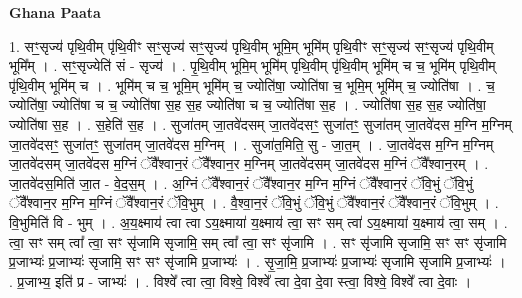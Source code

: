 \documentclass[17pt]{extarticle}
\begin{document}
\textbf{Ghana Paata } \newline

1. सꣳ॒॒सृज्य॑ पृथि॒वीम् पृ॑थि॒वीꣳ सꣳ॒॒सृज्य॑ सꣳ॒॒सृज्य॑ पृथि॒वीम् भूमि॒म् भूमि॑म् पृथि॒वीꣳ सꣳ॒॒सृज्य॑ सꣳ॒॒सृज्य॑ पृथि॒वीम् भूमि᳚म् । . सꣳ॒॒सृज्येति॑ सं - सृज्य॑ । . पृ॒थि॒वीम् भूमि॒म् भूमि॑म् पृथि॒वीम् पृ॑थि॒वीम् भूमि॑म् च च॒ भूमि॑म् पृथि॒वीम् पृ॑थि॒वीम् भूमि॑म् च । . भूमि॑म् च च॒ भूमि॒म् भूमि॑म् च॒ ज्योति॑षा॒ ज्योति॑षा च॒ भूमि॒म् भूमि॑म् च॒ ज्योति॑षा । . च॒ ज्योति॑षा॒ ज्योति॑षा च च॒ ज्योति॑षा स॒ह स॒ह ज्योति॑षा च च॒ ज्योति॑षा स॒ह । . ज्योति॑षा स॒ह स॒ह ज्योति॑षा॒ ज्योति॑षा स॒ह । . स॒हेति॑ स॒ह । . सुजा॑तम् जा॒तवे॑दसम् जा॒तवे॑दसꣳ॒॒ सुजा॑तꣳ॒॒ सुजा॑तम् जा॒तवे॑दस म॒ग्नि म॒ग्निम् जा॒तवे॑दसꣳ॒॒ सुजा॑तꣳ॒॒ सुजा॑तम् जा॒तवे॑दस म॒ग्निम् । . सुजा॑त॒मिति॒ सु - जा॒त॒म् । . जा॒तवे॑दस म॒ग्नि म॒ग्निम् जा॒तवे॑दसम् जा॒तवे॑दस म॒ग्निं ॅवै᳚श्वान॒रं ॅवै᳚श्वान॒र म॒ग्निम् जा॒तवे॑दसम् जा॒तवे॑दस म॒ग्निं ॅवै᳚श्वान॒रम् । . जा॒तवे॑दस॒मिति॑ जा॒त - वे॒द॒स॒म् । . अ॒ग्निं ॅवै᳚श्वान॒रं ॅवै᳚श्वान॒र म॒ग्नि म॒ग्निं ॅवै᳚श्वान॒रं ॅवि॒भुं ॅवि॒भुं ॅवै᳚श्वान॒र म॒ग्नि म॒ग्निं ॅवै᳚श्वान॒रं ॅवि॒भुम् । . वै॒श्वा॒न॒रं ॅवि॒भुं ॅवि॒भुं ॅवै᳚श्वान॒रं ॅवै᳚श्वान॒रं ॅवि॒भुम् । . वि॒भुमिति॑ वि - भुम् । . अ॒य॒क्ष्माय॑ त्वा त्वा ऽय॒क्ष्माया॑ य॒क्ष्माय॑ त्वा॒ सꣳ सम् त्वा॑ ऽय॒क्ष्माया॑ य॒क्ष्माय॑ त्वा॒ सम् । . त्वा॒ सꣳ सम् त्वा᳚ त्वा॒ सꣳ सृ॑जामि सृजामि॒ सम् त्वा᳚ त्वा॒ सꣳ सृ॑जामि । . सꣳ सृ॑जामि सृजामि॒ सꣳ सꣳ सृ॑जामि प्र॒जाभ्यः॑ प्र॒जाभ्यः॑ सृजामि॒ सꣳ सꣳ सृ॑जामि प्र॒जाभ्यः॑ । . सृ॒जा॒मि॒ प्र॒जाभ्यः॑ प्र॒जाभ्यः॑ सृजामि सृजामि प्र॒जाभ्यः॑ । . प्र॒जाभ्य॒ इति॑ प्र - जाभ्यः॑ । . विश्वे᳚ त्वा त्वा॒ विश्वे॒ विश्वे᳚ त्वा दे॒वा दे॒वा स्त्वा॒ विश्वे॒ विश्वे᳚ त्वा दे॒वाः । \newline
\end{document}
